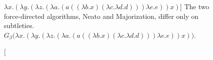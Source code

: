 \begin{figure}[htbp]
	\centering
	
	\caption
	[$\lambda x.(\lambda y.(\lambda z.(\lambda a.(a ((\lambda b.x) (\lambda c.\lambda d.d))) \lambda e.e)) x)$]
	{The two force-directed algorithms, Neato and Majorization, differ
	only on subtleties. $G_\beta\big(\lambda x.(\lambda y.(\lambda z.(\lambda a.(a ((\lambda b.x) (\lambda c.\lambda d.d))) \lambda e.e)) x)\big)$.}
	\label{fig:images_finite_ex_3_MAJOR}
\end{figure}

